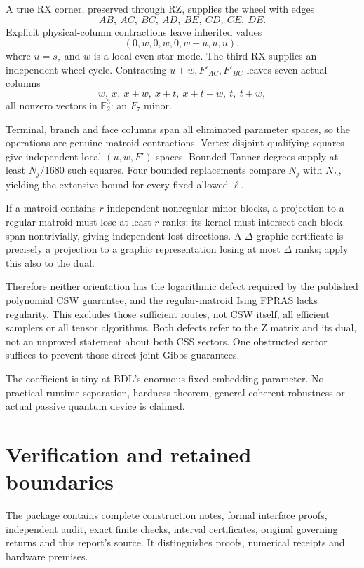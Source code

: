 \documentclass[11pt,a4paper]{article}
\newcommand{\F}{\mathbb F_2}\newcommand{\Bad}{\operatorname{Bad}}
\begin{document}
A true RX corner, preserved through RZ, supplies the wheel with edges
\[
 AB,\ AC,\ BC,\ AD,\ BE,\ CD,\ CE,\ DE.
\]
Explicit physical-column contractions leave inherited values
\[
 (0,w,0,w,0,w+u,u,u),
\]
where $u=s_z$ and $w$ is a local even-star mode. The third RX supplies an independent wheel cycle. Contracting $u+w,F'_{AC},F'_{BC}$ leaves seven actual columns
\[
 w,\ x,\ x+w,\ x+t,\ x+t+w,\ t,\ t+w,
\]
all nonzero vectors in $\F^3$: an $F_7$ minor.

Terminal, branch and face columns span all eliminated parameter spaces, so the operations are genuine matroid contractions. Vertex-disjoint qualifying squares give independent local $(u,w,F')$ spaces. Bounded Tanner degrees supply at least $N_j/1680$ such squares. Four bounded replacements compare $N_j$ with $N_L$, yielding the extensive bound for every fixed allowed $\ell$.

If a matroid contains $r$ independent nonregular minor blocks, a projection to a regular matroid must lose at least $r$ ranks: its kernel must intersect each block span nontrivially, giving independent lost directions. A $\Delta$-graphic certificate is precisely a projection to a graphic representation losing at most $\Delta$ ranks; apply this also to the dual.\cite{csw}

Therefore neither orientation has the logarithmic defect required by the published polynomial CSW guarantee, and the regular-matroid Ising FPRAS lacks regularity.\cite{gj} This excludes those sufficient routes, not CSW itself, all efficient samplers or all tensor algorithms. Both defects refer to the Z matrix and its dual, not an unproved statement about both CSS sectors. One obstructed sector suffices to prevent those direct joint-Gibbs guarantees.

The coefficient is tiny at BDL's enormous fixed embedding parameter. No practical runtime separation, hardness theorem, general coherent robustness or actual passive quantum device is claimed.
\section{Verification and retained boundaries}
The package contains complete construction notes, formal interface proofs, independent audit, exact finite checks, interval certificates, original governing returns and this report's source. It distinguishes proofs, numerical receipts and hardware premises.
\end{document}
